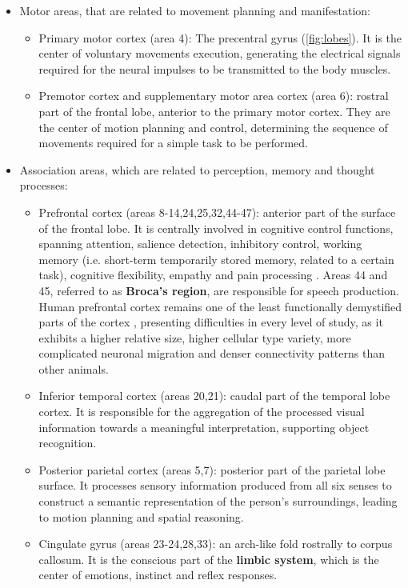 \begin{itemize}
	\item{Motor areas, that are related to movement planning and manifestation:
	\begin{itemize}
		\item {Primary motor cortex (area 4): The precentral gyrus (\autoref{fig:lobes}). It is the center of voluntary movements execution, generating the electrical signals required for the neural impulses to be transmitted to the body muscles. }
		\item {Premotor cortex and supplementary motor area cortex (area 6): rostral part of the frontal lobe, anterior to the primary motor cortex. They are the center of motion planning and control, determining the sequence of movements required for a simple task to be performed.}
	\end{itemize}}
	\item{Association areas, which are related to perception, memory and thought processes:
	\begin{itemize}
		\item{Prefrontal cortex (areas 8-14,24,25,32,44-47): anterior part of the surface of the frontal lobe. It is centrally involved in cognitive control functions, spanning attention, salience detection, inhibitory control, working memory (i.e. short-term temporarily stored memory, related to a certain task), cognitive flexibility, empathy and pain processing \cite{Ong2019}. Areas 44 and 45, referred to as \textbf{Broca's region}, are responsible for speech production. Human prefrontal cortex remains one of the least functionally demystified parts of the cortex , presenting difficulties in every level of study, as it exhibits a higher relative size, higher cellular type variety, more complicated neuronal migration and denser connectivity patterns than other animals.\cite{Chini2021}}
		\item {Inferior temporal cortex (areas 20,21): caudal part of the temporal lobe cortex. It is responsible for the aggregation of the processed visual information towards a meaningful interpretation, supporting object recognition.}
		\item {Posterior parietal cortex (areas 5,7): posterior part of the parietal lobe surface. It processes sensory information produced from  all six senses to construct a semantic representation of the person's surroundings, leading to motion planning and spatial reasoning.}
		\item{Cingulate gyrus (areas 23-24,28,33): an arch-like fold rostrally to corpus callosum. It is the conscious part of the \textbf{limbic system}, which is the center of emotions, instinct and reflex responses.}
	\end{itemize}
}	
\end{itemize}

